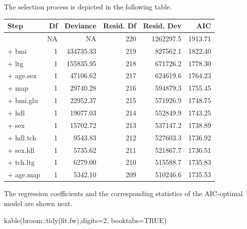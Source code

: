 \documentclass[
]{book}
\newenvironment{Shaded}{\begin{snugshade}}{\end{snugshade}}
\newcommand{\AttributeTok}[1]{\textcolor[rgb]{0.77,0.63,0.00}{#1}}
\newcommand{\ConstantTok}[1]{\textcolor[rgb]{0.00,0.00,0.00}{#1}}
\newcommand{\DecValTok}[1]{\textcolor[rgb]{0.00,0.00,0.81}{#1}}
\newcommand{\FunctionTok}[1]{\textcolor[rgb]{0.00,0.00,0.00}{#1}}
\newcommand{\NormalTok}[1]{#1}
\newcommand{\SpecialCharTok}[1]{\textcolor[rgb]{0.00,0.00,0.00}{#1}}
\begin{document}
The selection process is depicted in the following table.

\begin{Shaded}
\end{Shaded}

\begin{tabular}{lrrrrr}
\toprule
Step & Df & Deviance & Resid. Df & Resid. Dev & AIC\\
\midrule
 & NA & NA & 220 & 1262297.5 & 1913.71\\
+ bmi & 1 & 434735.33 & 219 & 827562.1 & 1822.40\\
+ ltg & 1 & 155835.95 & 218 & 671726.2 & 1778.30\\
+ age.sex & 1 & 47106.62 & 217 & 624619.6 & 1764.23\\
+ map & 1 & 29740.28 & 216 & 594879.3 & 1755.45\\
\addlinespace
+ bmi.glu & 1 & 22952.37 & 215 & 571926.9 & 1748.75\\
+ hdl & 1 & 19077.03 & 214 & 552849.9 & 1743.25\\
+ sex & 1 & 15702.72 & 213 & 537147.2 & 1738.89\\
+ hdl.tch & 1 & 9543.83 & 212 & 527603.3 & 1736.92\\
+ sex.ldl & 1 & 5735.62 & 211 & 521867.7 & 1736.51\\
\addlinespace
+ tch.ltg & 1 & 6279.00 & 210 & 515588.7 & 1735.83\\
+ age.map & 1 & 5342.10 & 209 & 510246.6 & 1735.53\\
\bottomrule
\end{tabular}

The regression coefficients and the corresponding statistics of the AIC-optimal model are shown next.

\begin{Shaded}
\begin{Highlighting}[]
\FunctionTok{kable}\NormalTok{(broom}\SpecialCharTok{::}\FunctionTok{tidy}\NormalTok{(fit.fw),}\AttributeTok{digits=}\DecValTok{2}\NormalTok{,}
      \AttributeTok{booktabs=}\ConstantTok{TRUE}\NormalTok{)}
\end{Highlighting}
\end{Shaded}
\end{document}

